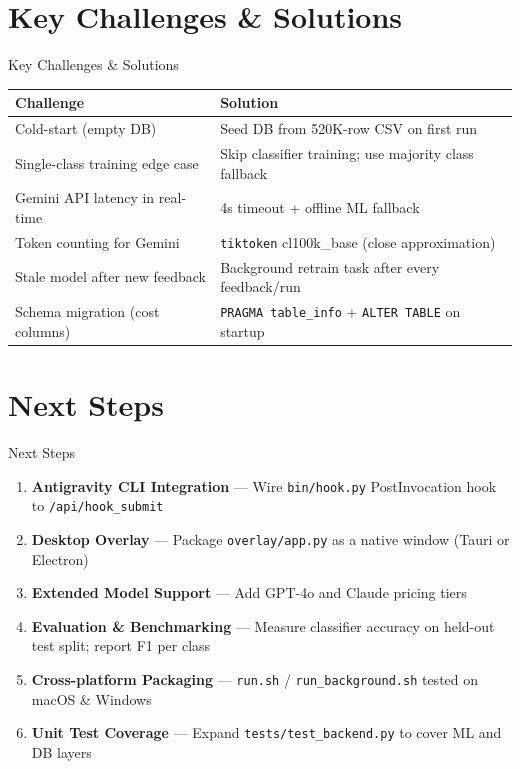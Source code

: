 \documentclass[aspectratio=169]{beamer}
\begin{document}
\section{Key Challenges \& Solutions}
\begin{frame}{Key Challenges \& Solutions}
  \begin{table}
    \small
    \begin{tabular}{p{4.5cm} p{6.5cm}}
      \toprule
      \textbf{Challenge} & \textbf{Solution} \\
      \midrule
      Cold-start (empty DB) & Seed DB from 520K-row CSV on first run \\
      Single-class training edge case & Skip classifier training; use majority class fallback \\
      Gemini API latency in real-time & 4s timeout + offline ML fallback \\
      Token counting for Gemini & \texttt{tiktoken} cl100k\_base (close approximation) \\
      Stale model after new feedback & Background retrain task after every feedback/run \\
      Schema migration (cost columns) & \texttt{PRAGMA table\_info} + \texttt{ALTER TABLE} on startup \\
      \bottomrule
    \end{tabular}
  \end{table}
\end{frame}

\section{Next Steps}
\begin{frame}{Next Steps}
  \begin{enumerate}
    \item \textbf{Antigravity CLI Integration} — Wire \texttt{bin/hook.py} PostInvocation hook to \texttt{/api/hook\_submit}
    \item \textbf{Desktop Overlay} — Package \texttt{overlay/app.py} as a native window (Tauri or Electron)
    \item \textbf{Extended Model Support} — Add GPT-4o and Claude pricing tiers
    \item \textbf{Evaluation \& Benchmarking} — Measure classifier accuracy on held-out test split; report F1 per class
    \item \textbf{Cross-platform Packaging} — \texttt{run.sh} / \texttt{run\_background.sh} tested on macOS \& Windows
    \item \textbf{Unit Test Coverage} — Expand \texttt{tests/test\_backend.py} to cover ML and DB layers
  \end{enumerate}
\end{frame}
\end{document}
